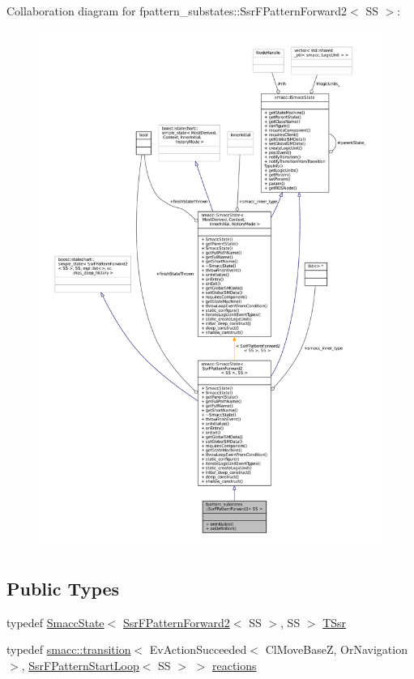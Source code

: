 Collaboration diagram for fpattern\+\_\+substates\+:\+:Ssr\+F\+Pattern\+Forward2$<$ SS $>$\+:
\nopagebreak
\begin{figure}[H]
\begin{center}
\leavevmode
\includegraphics[width=350pt]{structfpattern__substates_1_1SsrFPatternForward2__coll__graph}
\end{center}
\end{figure}
\subsection*{Public Types}
\begin{DoxyCompactItemize}
\item 
typedef \hyperlink{classSmaccState}{Smacc\+State}$<$ \hyperlink{structfpattern__substates_1_1SsrFPatternForward2}{Ssr\+F\+Pattern\+Forward2}$<$ SS $>$, SS $>$ \hyperlink{structfpattern__substates_1_1SsrFPatternForward2_a6da984f60e29760330b5e98020d8944f}{T\+Ssr}
\item 
typedef \hyperlink{classsmacc_1_1transition}{smacc\+::transition}$<$ Ev\+Action\+Succeeded$<$ Cl\+Move\+BaseZ, Or\+Navigation $>$, \hyperlink{structfpattern__substates_1_1SsrFPatternStartLoop}{Ssr\+F\+Pattern\+Start\+Loop}$<$ SS $>$ $>$ \hyperlink{structfpattern__substates_1_1SsrFPatternForward2_afc4663e9f3257bf96a2700736e4d74c8}{reactions}
\end{DoxyCompactItemize}
